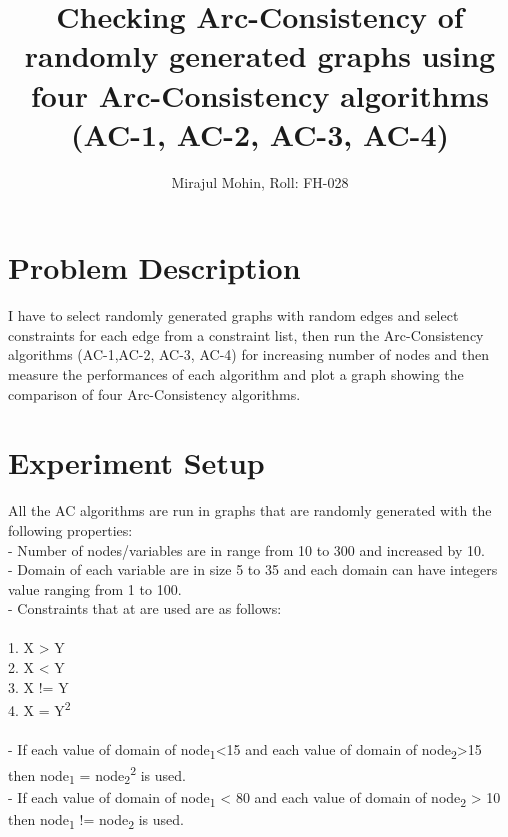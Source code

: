\documentclass[12pt,twocolumn,letterpaper]{article}
\title{
		\usefont{OT1}{bch}{b}{n}
		\normalfont \normalsize 
		\large \textbf{Checking Arc-Consistency of randomly generated graphs using four Arc-Consistency algorithms (AC-1, AC-2, AC-3, AC-4) } \\
}
\author[0]{Mirajul Mohin, Roll: FH-028 
            
		}
\begin{document}
\maketitle

\section*{Problem Description}
I have to select randomly generated graphs with random edges and select constraints for each edge from a constraint list, then run the Arc-Consistency algorithms (AC-1,AC-2, AC-3, AC-4) for increasing number of nodes and then measure the performances of each algorithm and plot a graph showing the comparison of four Arc-Consistency algorithms.

\section*{Experiment Setup}
All the AC algorithms are run in graphs that are randomly generated with the following properties:\\
- Number of nodes/variables are in range from 10 to 300 and increased by 10.\\
- Domain of each variable are in size 5 to 35 and each domain can have integers value ranging from 1 to 100.\\
- Constraints that at are used are as follows:\\\\ 1. X > Y\\
2. X < Y\\
3. X != Y \\
4. X = Y\textsuperscript{2} \\ \\
- If each value of domain of node\textsubscript{1}<15 and each value of domain of node\textsubscript{2}>15 then node\textsubscript{1} = node\textsubscript{2}\textsuperscript{2} is used. \\
- If each value of domain of node\textsubscript{1} < 80 and each value of domain of node\textsubscript{2} > 10 then
node\textsubscript{1} != node\textsubscript{2} is used.
\end{document}
